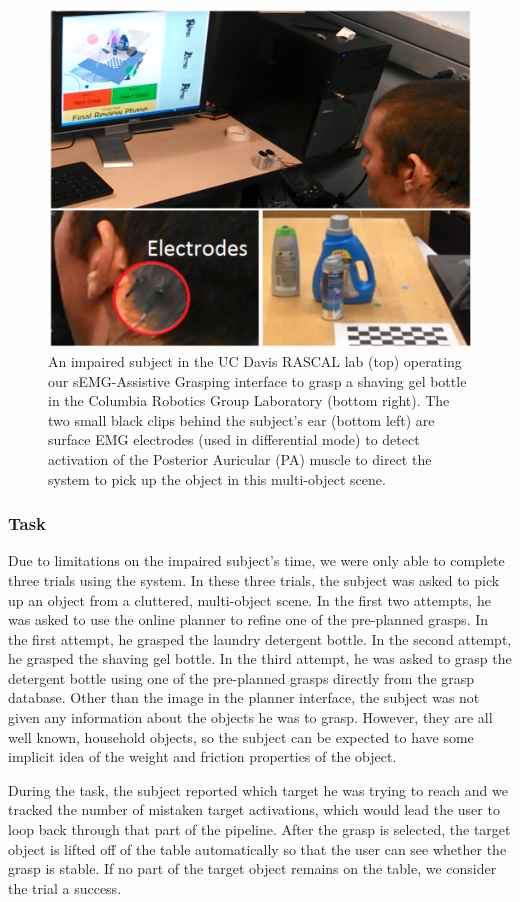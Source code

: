 \begin{figure}
\centering
\includegraphics[width=.8\columnwidth]{user_semg.png}
\caption{An impaired subject in the UC Davis RASCAL
lab (top) operating our sEMG-Assistive Grasping interface
to grasp a shaving gel bottle in the Columbia Robotics
Group Laboratory (bottom right). The two small black clips
behind the subject’s ear (bottom left) are surface EMG
electrodes (used in differential mode) to detect activation of
the Posterior Auricular (PA) muscle to direct the system to
pick up the object in this multi-object scene.}
\label{fig:user-semg}
\end{figure}


\subsubsection{Task}
Due to limitations on the impaired subject's time, we were only able to complete three trials using the system. In these three trials,  the subject was asked to pick up an object from a cluttered, multi-object scene. In the first two attempts, he was asked to use the online planner to refine one of the pre-planned grasps. In the first attempt, he grasped the laundry detergent bottle. In the second attempt, he grasped the shaving gel bottle. In the third attempt, he was asked to grasp the detergent bottle using one of the pre-planned grasps directly from the grasp database. Other than the image in the planner interface, the subject was not given any information about the objects he was to grasp. However, they are all well known, household objects, so the subject can be expected to have some implicit idea of the weight and friction properties of the object. 


During the task, the subject reported which target he was trying to reach and we tracked the number of mistaken target activations, which would lead the user to loop back through that part of the pipeline. After the grasp is selected, the target object is lifted off of the table automatically so that the user can see whether the grasp is stable. If no part of the target object remains on the table, we consider the trial a success.


